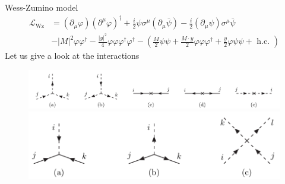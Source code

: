 \documentclass[10pt]{beamer}
\begin{document}
\begin{frame}{Wess-Zumino model}
    \begin{equation*}
        \begin{aligned}
            \mathcal{L}_{\mathrm{Wz}} &=\left(\partial_{\mu} \varphi\right)\left(\partial^{\mu} \varphi\right)^{\dagger}+\frac{i}{2} \psi \sigma^{\mu}\left(\partial_{\mu} \bar{\psi}\right)-\frac{i}{2}\left(\partial_{\mu} \psi\right) \sigma^{\mu} \bar{\psi} \\
            &-|M|^{2} \varphi \varphi^{\dagger}-\frac{|y|^{2}}{4} \varphi \varphi \varphi^{\dagger} \varphi^{\dagger}-\left(\frac{M}{2} \psi \psi+\frac{M \cdot y}{2} \varphi \varphi \varphi^{\dagger}+\frac{y}{2} \varphi \psi \psi+\text { h.c. }\right)
            \end{aligned}
    \end{equation*}
    Let us give a look at the interactions
        \begin{figure}
            \centering
            \includegraphics[scale=0.3]{feynman1.png}
            \includegraphics[scale=0.3]{feynman2.png}
        \end{figure}
\end{frame}

\begin{frame}
    
\end{frame}
    
\end{document}
